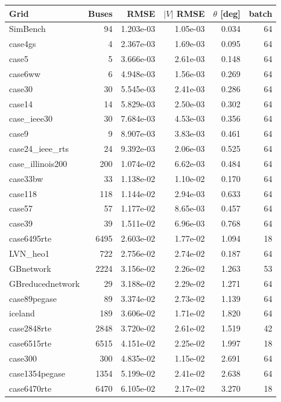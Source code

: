 \documentclass[10pt]{article}
\begin{document}
\begin{table}[H]
\centering
\small
\begin{tabular}{lrrrrr}
\toprule
Grid & Buses & RMSE & $|V|$ RMSE & $\theta$ [deg] & batch \\
\midrule
SimBench & 94 & 1.203e-03 & 1.05e-03 & 0.034 & 64 \\
case4gs & 4 & 2.367e-03 & 1.69e-03 & 0.095 & 64 \\
case5 & 5 & 3.666e-03 & 2.61e-03 & 0.148 & 64 \\
case6ww & 6 & 4.948e-03 & 1.56e-03 & 0.269 & 64 \\
case30 & 30 & 5.545e-03 & 2.41e-03 & 0.286 & 64 \\
case14 & 14 & 5.829e-03 & 2.50e-03 & 0.302 & 64 \\
case\_ieee30 & 30 & 7.684e-03 & 4.53e-03 & 0.356 & 64 \\
case9 & 9 & 8.907e-03 & 3.83e-03 & 0.461 & 64 \\
case24\_ieee\_rts & 24 & 9.392e-03 & 2.06e-03 & 0.525 & 64 \\
case\_illinois200 & 200 & 1.074e-02 & 6.62e-03 & 0.484 & 64 \\
case33bw & 33 & 1.138e-02 & 1.10e-02 & 0.170 & 64 \\
case118 & 118 & 1.144e-02 & 2.94e-03 & 0.633 & 64 \\
case57 & 57 & 1.177e-02 & 8.65e-03 & 0.457 & 64 \\
case39 & 39 & 1.511e-02 & 6.96e-03 & 0.768 & 64 \\
case6495rte & 6495 & 2.603e-02 & 1.77e-02 & 1.094 & 18 \\
LVN\_heo1 & 722 & 2.756e-02 & 2.74e-02 & 0.187 & 64 \\
GBnetwork & 2224 & 3.156e-02 & 2.26e-02 & 1.263 & 53 \\
GBreducednetwork & 29 & 3.188e-02 & 2.29e-02 & 1.271 & 64 \\
case89pegase & 89 & 3.374e-02 & 2.73e-02 & 1.139 & 64 \\
iceland & 189 & 3.606e-02 & 1.71e-02 & 1.820 & 64 \\
case2848rte & 2848 & 3.720e-02 & 2.61e-02 & 1.519 & 42 \\
case6515rte & 6515 & 4.151e-02 & 2.25e-02 & 1.997 & 18 \\
case300 & 300 & 4.835e-02 & 1.15e-02 & 2.691 & 64 \\
case1354pegase & 1354 & 5.199e-02 & 2.41e-02 & 2.638 & 64 \\
case6470rte & 6470 & 6.105e-02 & 2.17e-02 & 3.270 & 18 \\

\end{tabular}
\end{table}
\end{document}
